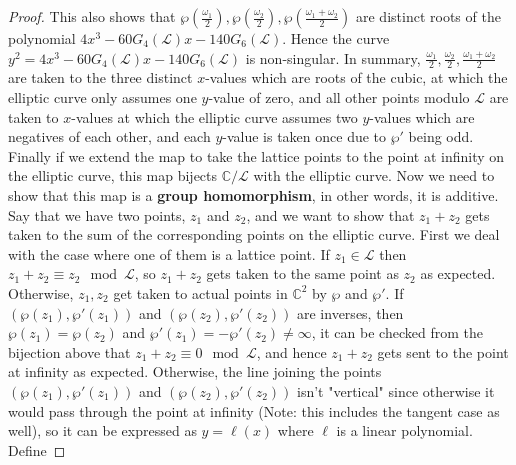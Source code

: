\documentclass[10pt,a4paper]{amsart}
\begin{document}
\begin{proof}


This also shows that $\wp(\frac{\omega_1}2),\wp(\frac{\omega_2}2),\wp(\frac{\omega_1+\omega_2}2)$ are distinct roots of the polynomial $4x^3-60G_4(\mathcal L)x-140G_6(\mathcal L)$. Hence the curve $y^2=4x^3-60G_4(\mathcal L)x-140G_6(\mathcal L)$ is non-singular. 
\newline\newline
In summary, $\frac{\omega_1}2,\frac{\omega_2}2,\frac{\omega_1+\omega_2}2$ are taken to the three distinct $x$-values which are roots of the cubic, at which the elliptic curve only assumes one $y$-value of zero, and all other points modulo $\mathcal{L}$ are taken to $x$-values at which the elliptic curve assumes two $y$-values which are negatives of each other, and each $y$-value is taken once due to $\wp'$ being odd. Finally if we extend the map to take the lattice points to the point at infinity on the elliptic curve, this map bijects $\mathbb C/\mathcal L$ with the elliptic curve.
\newline\newline
Now we need to show that this map is a \textbf{group homomorphism}, in other words, it is additive. Say that we have two points, $z_1$ and $z_2$, and we want to show that $z_1+z_2$ gets taken to the sum of the corresponding points on the elliptic curve. First we deal with the case where one of them is a lattice point. If $z_1\in\mathcal L$ then $z_1+z_2\equiv z_2\mod\mathcal L$, so $z_1+z_2$ gets taken to the same point as $z_2$ as expected. Otherwise, $z_1,z_2$ get taken to actual points in $\mathbb C^2$ by $\wp$ and $\wp'$. If $(\wp(z_1),\wp'(z_1))$ and $(\wp(z_2),\wp'(z_2))$ are inverses, then $\wp(z_1)=\wp(z_2)$ and $\wp'(z_1)=-\wp'(z_2)\neq\infty$, it can be checked from the bijection above that $z_1+z_2\equiv0\mod\mathcal L$, and hence $z_1+z_2$ gets sent to the point at infinity as expected. Otherwise, the line joining the points $(\wp(z_1),\wp'(z_1))$ and $(\wp(z_2),\wp'(z_2))$ isn't "vertical" since otherwise it would pass through the point at infinity (Note: this includes the tangent case as well), so it can be expressed as $y=\ell(x)$ where $\ell$ is a linear polynomial. Define

\end{proof}
\end{document}
